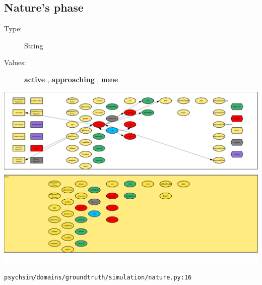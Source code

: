 \documentclass{article}%
\begin{document}
%
\subsection{Nature's phase}%
\label{subsec:Nature's phase}%
\begin{description}%
\item[Type:]%
String%
\item[Values:]%
\textbf{active}%
, %
\textbf{approaching}%
, %
\textbf{none}%
\end{description}%
\includegraphics[width=\textwidth]{images/phaseOfNature.png}%
\begin{flushleft}%
\verb|psychsim/domains/groundtruth/simulation/nature.py:16|%
\end{flushleft}%
\end{document}
